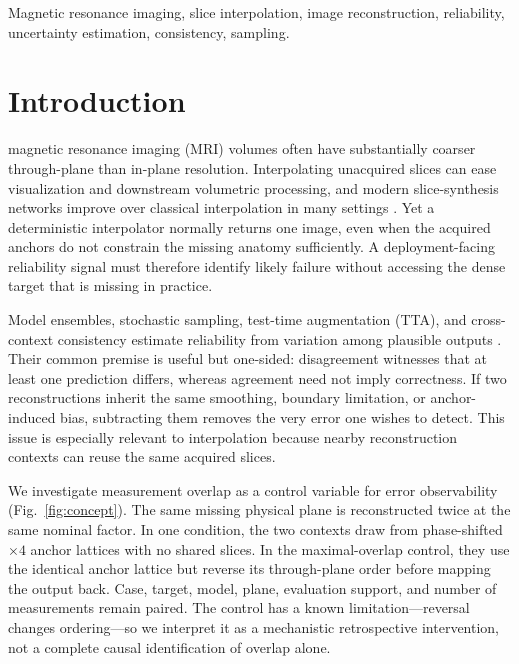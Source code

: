 \documentclass[journal,10pt]{IEEEtran}
\begin{document}
\begin{IEEEkeywords}
Magnetic resonance imaging, slice interpolation, image reconstruction, reliability, uncertainty estimation, consistency, sampling.
\end{IEEEkeywords}

\section{Introduction}
 magnetic resonance imaging (MRI) volumes often have substantially coarser through-plane than in-plane resolution. Interpolating unacquired slices can ease visualization and downstream volumetric processing, and modern slice-synthesis networks improve over classical interpolation in many settings \cite{peng2020saint,song2024i3net}. Yet a deterministic interpolator normally returns one image, even when the acquired anchors do not constrain the missing anatomy sufficiently. A deployment-facing reliability signal must therefore identify likely failure without accessing the dense target that is missing in practice.

Model ensembles, stochastic sampling, test-time augmentation (TTA), and cross-context consistency estimate reliability from variation among plausible outputs \cite{gal2016dropout,lakshminarayanan2017ensembles,edupuganti2021uncertainty,narnhofer2022bayesian}. Their common premise is useful but one-sided: disagreement witnesses that at least one prediction differs, whereas agreement need not imply correctness. If two reconstructions inherit the same smoothing, boundary limitation, or anchor-induced bias, subtracting them removes the very error one wishes to detect. This issue is especially relevant to interpolation because nearby reconstruction contexts can reuse the same acquired slices.

We investigate measurement overlap as a control variable for error observability (Fig.~\ref{fig:concept}). The same missing physical plane is reconstructed twice at the same nominal factor. In one condition, the two contexts draw from phase-shifted $\times4$ anchor lattices with no shared slices. In the maximal-overlap control, they use the identical anchor lattice but reverse its through-plane order before mapping the output back. Case, target, model, plane, evaluation support, and number of measurements remain paired. The control has a known limitation---reversal changes ordering---so we interpret it as a mechanistic retrospective intervention, not a complete causal identification of overlap alone.
\end{document}
